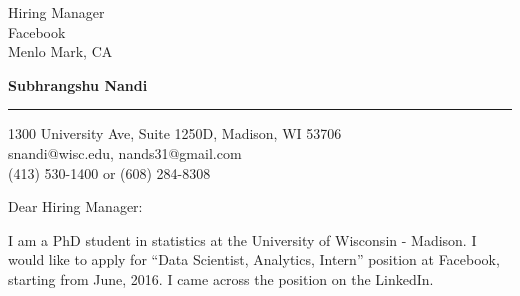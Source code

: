 \documentclass{letter} %
\begin{document}
\signature{Subhrangshu Nandi}           %
\longindentation=0pt                       %
\let\raggedleft\raggedright                %
 
 
\begin{letter}
{Hiring Manager \\
Facebook \\
Menlo Mark, CA
}


\begin{flushleft}
{\bf Subhrangshu Nandi}
\end{flushleft}
\medskip\hrule height 1pt
\begin{flushright}
\hfill 1300 University Ave, Suite 1250D, Madison, WI 53706 \\
\hfill snandi@wisc.edu, nands31@gmail.com\\
\hfill (413) 530-1400 or (608) 284-8308
\end{flushright} 
\vfill %

\opening{Dear Hiring Manager:} 
 
\noindent %
I am a PhD student in statistics at the University of Wisconsin - Madison. I would like to apply for ``Data Scientist, Analytics, Intern'' position at Facebook, starting from June, 2016. I came across the position on the LinkedIn.
 

\end{letter}
\end{document}
